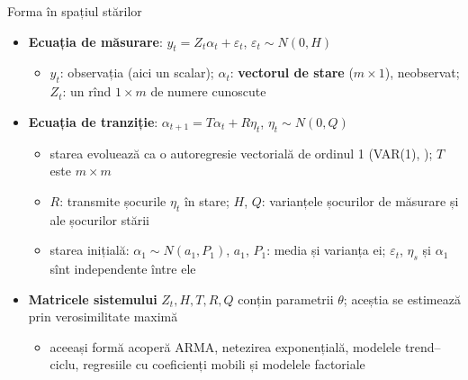 \begin{frame}{Forma în spațiul stărilor}
\itemsize{\small}
\begin{itemize}
    \item \textbf{Ecuația de măsurare}: $y_t = Z_t\alpha_t + \varepsilon_t$, \quad $\varepsilon_t \sim N(0, H)$
    \begin{itemize}
        \item $y_t$: observația (aici un scalar); $\alpha_t$: \textbf{vectorul de stare} ($m \times 1$), neobservat; $Z_t$: un rînd $1 \times m$ de numere cunoscute
    \end{itemize}
    \item \textbf{Ecuația de tranziție}: $\alpha_{t+1} = T\alpha_t + R\eta_t$, \quad $\eta_t \sim N(0, Q)$
    \begin{itemize}
        \item starea evoluează ca o autoregresie vectorială de ordinul 1 (VAR(1), ); $T$ este $m \times m$
        \item $R$: transmite șocurile $\eta_t$ în stare; $H$, $Q$: varianțele șocurilor de măsurare și ale șocurilor stării
        \item starea inițială: $\alpha_1 \sim N(a_1, P_1)$, $a_1$, $P_1$: media și varianța ei; $\varepsilon_t$, $\eta_s$ și $\alpha_1$ sînt independente între ele
    \end{itemize}
    \item \textbf{Matricele sistemului} $Z_t, H, T, R, Q$ conțin parametrii $\theta$; aceștia se estimează prin verosimilitate maximă
    \begin{itemize}
        \item aceeași formă acoperă ARMA, netezirea exponențială, modelele trend--ciclu, regresiile cu coeficienți mobili și modelele factoriale 
    \end{itemize}
\end{itemize}
\end{frame}

